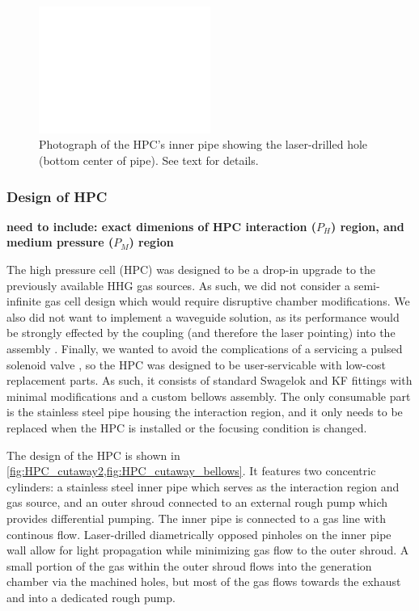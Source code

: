 \begin{figure}
	\centering
	\includegraphics[width=0.5\textwidth]{figures/chap3/HPC_laserhole_500x370.png}
	\caption{Photograph of the HPC's inner pipe showing the laser-drilled hole (bottom center of pipe). See text for details.}
	\label{fig:HPC_laserhole}
\end{figure}


\subsubsection{Design of HPC}

\textbf{need to include: exact dimenions of HPC interaction ($P_H$) region, and medium pressure ($P_M$) region}

The high pressure cell (HPC) was designed to be a drop-in upgrade to the previously available HHG gas sources. As such, we did not consider a semi-infinite gas cell design which would require disruptive chamber modifications. We also did not want to implement a waveguide solution, as its performance would be strongly effected by the coupling (and therefore the laser pointing) into the assembly \cite{popmintchevExtendedPhaseMatching2008,popmintchevPhaseMatchingHigh2009}. Finally, we wanted to avoid the complications of a servicing a pulsed solenoid valve \cite{evenEvenLavieValveSource2015}, so the HPC was designed to be user-servicable with low-cost replacement parts. As such, it consists of standard Swagelok and KF fittings with minimal modifications and a custom bellows assembly. The only consumable part is the stainless steel pipe housing the interaction region, and it only needs to be replaced when the HPC is installed or the focusing condition is changed.

The design of the HPC is shown in \cref{fig:HPC_cutaway2,fig:HPC_cutaway_bellows}. It features two concentric cylinders: a stainless steel inner pipe which serves as the interaction region and gas source, and an outer shroud connected to an external rough pump which provides differential pumping. The inner pipe is connected to a gas line with continous flow. Laser-drilled diametrically opposed pinholes on the inner pipe wall allow for light propagation while minimizing gas flow to the outer shroud. A small portion of the gas within the outer shroud flows into the generation chamber via the machined holes, but most of the gas flows towards the exhaust and into a dedicated rough pump.


